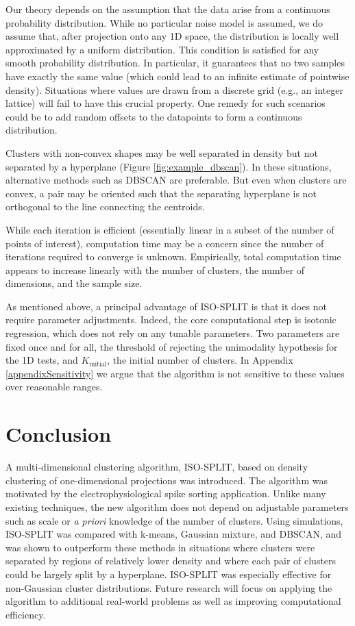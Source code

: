\documentclass[10pt]{article}
\begin{document}
Our theory depends on the assumption that the data arise from a continuous probability distribution. While no particular noise model is assumed, we do assume that, after projection onto any 1D space, the distribution is locally well approximated by a uniform distribution. This condition is satisfied for any smooth probability distribution. In particular, it guarantees that no two samples have exactly the same value (which could lead to an infinite estimate of pointwise density). Situations where values are drawn from a discrete grid (e.g., an integer lattice) will fail to have this crucial property. One remedy for such scenarios could be to add random offsets to the datapoints to form a continuous distribution.

Clusters with non-convex shapes may be well separated in density but not separated by a hyperplane (Figure \ref{fig:example_dbscan}). In these situations, alternative methods such as DBSCAN are preferable. But even when clusters are convex, a pair may be oriented such that the separating hyperplane is not orthogonal to the line connecting the centroids.

While each iteration is efficient (essentially linear in a subset of the number of points of interest), computation time may be a concern since the number of iterations required to converge is unknown. Empirically, total computation time appears to increase linearly with the number of clusters, the number of dimensions, and the sample size.

As mentioned above, a principal advantage of ISO-SPLIT is that it does not require parameter adjustments. Indeed, the core computational step is isotonic regression, which does not rely on any tunable parameters. Two parameters are fixed once and for all, the threshold of rejecting the unimodality hypothesis for the 1D tests, and $K_\text{initial}$, the initial number of clusters. In Appendix \ref{appendixSensitivity} we argue that the algorithm is not sensitive to these values over reasonable ranges.

\section{Conclusion}
\label{s:conc}

A multi-dimensional clustering algorithm, ISO-SPLIT, based on density clustering of one-dimensional projections was introduced. The algorithm was motivated by the electrophysiological spike sorting application. Unlike many existing techniques, the new algorithm does not depend on adjustable parameters such as scale or \emph{a priori} knowledge of the number of clusters. Using simulations, ISO-SPLIT was compared with k-means, Gaussian mixture, and DBSCAN, and was shown to outperform these methods in situations where clusters were separated by regions of relatively lower density and where each pair of clusters could be largely split by a hyperplane. ISO-SPLIT was especially effective for non-Gaussian cluster distributions. Future research will focus on applying the algorithm to additional real-world problems as well as improving computational efficiency.
\end{document}
